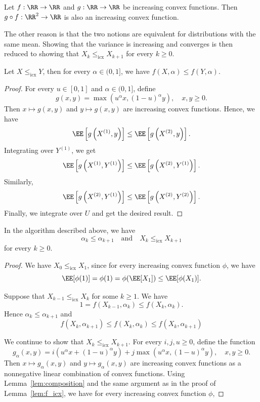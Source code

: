 \begin{lemma}
  \label{lem:composition}
  Let $f:\RR\to \RR$ and $g:\RR\to \RR$ be increasing convex functions. Then $g\circ f:\RR^2\to \RR$ is also an increasing convex function.
\end{lemma}

The other reason is that the two notions are equivalent for distributions with the same mean. Showing that the variance is increasing and converges is then reduced to showing that $X_k\le_{\text{icx}} X_{k+1}$ for every $k\ge 0$.


\begin{lemma}
  \label{lem:f_icx}
  Let $X\le_{\text{icx}} Y$, then for every $\alpha\in (0,1]$, we have $f(X, \alpha)\le f(Y, \alpha)$.
\end{lemma}
\begin{proof}
  For every $u\in[0,1]$ and $\alpha\in (0,1]$, define
  $$g(x,y) = \max(u^\alpha x, (1-u)^\alpha y), \quad x,y\ge 0.$$
  Then $x\mapsto g(x,y)$ and $y\mapsto g(x,y)$ are increasing convex functions. Hence, we have
  $$\EE\left[g\left(X^{(1)}, y\right)\right] \le \EE\left[g\left(X^{(2)}, y\right)\right].$$
  Integrating over $Y^{(1)}$, we get
  $$\EE\left[g\left(X^{(1)}, Y^{(1)}\right)\right] \le \EE\left[g\left(X^{(2)}, Y^{(1)}\right)\right].$$
  Similarly, $$\EE\left[g\left(X^{(2)}, Y^{(1)}\right)\right] \le \EE\left[g\left(X^{(2)}, Y^{(2)}\right)\right].$$
  Finally, we integrate over $U$ and get the desired result.
\end{proof}

\begin{lemma}
  In the algorithm described above, we have
  $$\alpha_k\le \alpha_{k+1} \quad \text{and} \quad X_k\le_{\text{icx}} X_{k+1}$$
  for every $k\ge 0$.
\end{lemma}

\begin{proof}
  We have $X_0\le_{\text{icx}} X_1$, since for every increasing convex function $\phi$, we have
  $$\EE[\phi(1)] = \phi(1) = \phi(\EE[X_1]) \le \EE[\phi(X_1)].$$

  Suppose that $X_{k-1}\le_{\text{icx}} X_k$ for some $k\ge 1$. We have
  $$1 = f\left(X_{k-1}, \alpha_k\right) \le f\left(X_{k}, \alpha_k\right).$$
  Hence $\alpha_k\le \alpha_{k+1}$ and
  $$f\left(X_{k}, \alpha_{k+1}\right) \le f\left(X_{k}, \alpha_{k}\right) \le f\left(X_{k}, \alpha_{k+1}\right)$$


  We continue to show that $X_k\le_{\text{icx}} X_{k+1}$. For every $i,j,u\ge 0$, define the function
  $$g_{\alpha}(x,y) = i(u^\alpha x + (1-u)^\alpha y) + j\max(u^\alpha x, (1-u)^\alpha y), \quad x,y\ge 0.$$
  Then $x\mapsto g_{\alpha}(x,y)$ and $y\mapsto g_{\alpha}(x,y)$ are increasing convex functions as a nonnegative linear combination of convex functions. Using Lemma~\ref{lem:composition} and the same argument as in the proof of Lemma~\ref{lem:f_icx}, we have for every increasing convex function $\phi$,
\end{proof}
